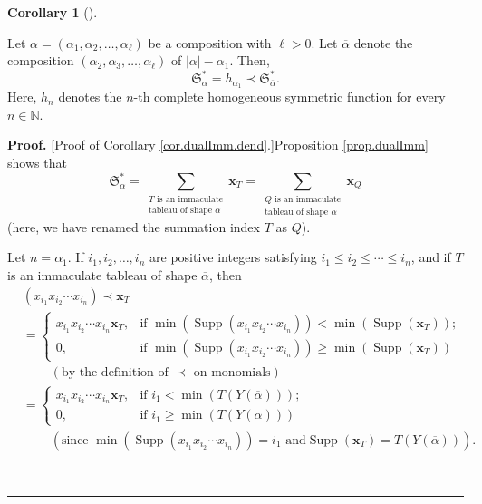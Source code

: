 \documentclass[numbers=enddot,12pt,final,onecolumn,notitlepage,abstracton]{scrartcl}%
\theoremstyle{definition}
\newtheorem{coro}[theo]{Corollary}
\newenvironment{corollary}[1][]
{\begin{coro}[#1]\begin{leftbar}}
{\end{leftbar}\end{coro}}
\newenvironment{proof}[1][Proof]{\noindent\textbf{#1.} }{\ \rule{0.5em}{0.5em}}
\let\sumnonlimits\sum
\renewcommand{\sum}{\sumnonlimits\limits}
\begin{document}
\begin{corollary}
\label{cor.dualImm.dend}Let $\alpha=\left(  \alpha_{1},\alpha_{2}%
,\ldots,\alpha_{\ell}\right)  $ be a composition with $\ell>0$. Let
$\overline{\alpha}$ denote the composition $\left(  \alpha_{2},\alpha
_{3},\ldots,\alpha_{\ell}\right)  $ of $\left\vert \alpha\right\vert
-\alpha_{1}$. Then,%
\[
\mathfrak{S}_{\alpha}^{\ast}=h_{\alpha_{1}}\left.  \prec\right.
\mathfrak{S}_{\overline{\alpha}}^{\ast}.
\]
Here, $h_{n}$ denotes the $n$-th complete homogeneous symmetric function for
every $n\in\mathbb{N}$.
\end{corollary}


\begin{proof}
[Proof of Corollary \ref{cor.dualImm.dend}.]Proposition \ref{prop.dualImm}
shows that
\begin{equation}
\mathfrak{S}_{\alpha}^{\ast}=\sum_{\substack{T\text{ is an immaculate}%
\\\text{tableau of shape }\alpha}}\mathbf{x}_{T}=\sum_{\substack{Q\text{ is an
immaculate}\\\text{tableau of shape }\alpha}}\mathbf{x}_{Q}
\label{pf.cor.dualImm.dend.LHS}%
\end{equation}
(here, we have renamed the summation index $T$ as $Q$).

Let $n=\alpha_{1}$. If $i_{1},i_{2},\ldots,i_{n}$ are positive integers
satisfying $i_{1}\leq i_{2}\leq\cdots\leq i_{n}$, and if $T$ is an immaculate
tableau of shape $\overline{\alpha}$, then%
\begin{align}
&  \left(  x_{i_{1}}x_{i_{2}}\cdots x_{i_{n}}\right)  \left.  \prec\right.
\mathbf{x}_{T}\nonumber\\
&  =
\begin{cases}
x_{i_{1}}x_{i_{2}}\cdots x_{i_{n}}\mathbf{x}_{T}, & \text{if } \min\left(
\operatorname*{Supp}\left(  x_{i_{1}}x_{i_{2}}\cdots x_{i_{n}}\right)
\right)  <\min\left(  \operatorname*{Supp}\left(  \mathbf{x}_{T}\right)
\right)  ;\\
0, & \text{if }\min\left(  \operatorname*{Supp}\left(  x_{i_{1}}x_{i_{2}%
}\cdots x_{i_{n}}\right)  \right)  \geq\min\left(  \operatorname*{Supp}\left(
\mathbf{x}_{T}\right)  \right)
\end{cases}
\nonumber\\
&  \ \ \ \ \ \ \ \ \ \ \left(  \text{by the definition of }\left.
\prec\right.  \text{ on monomials}\right) \nonumber\\
&  =
\begin{cases}
x_{i_{1}}x_{i_{2}}\cdots x_{i_{n}}\mathbf{x}_{T}, & \text{if } i_{1}%
<\min\left(  T\left(  Y\left(  \overline{\alpha}\right)  \right)  \right)  ;\\
0, & \text{if }i_{1}\geq\min\left(  T\left(  Y\left(  \overline{\alpha
}\right)  \right)  \right)
\end{cases}
\label{pf.cor.dualImm.dend.1}\\
&  \ \ \ \ \ \ \ \ \ \ \left(  \text{since }\min\left(  \operatorname*{Supp}%
\left(  x_{i_{1}}x_{i_{2}}\cdots x_{i_{n}}\right)  \right)  =i_{1}\text{ and
}\operatorname*{Supp}\left(  \mathbf{x}_{T}\right)  =T\left(  Y\left(
\overline{\alpha}\right)  \right)  \right)  .\nonumber
\end{align}



\end{proof}
\end{document}
